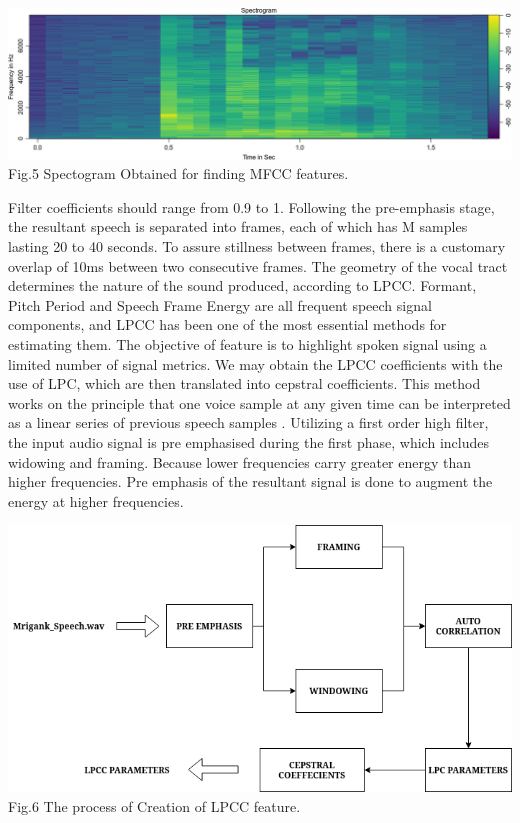 \documentclass[11pt,a4paper]{article}
\begin{document}
    \begin{center}
	
	\includegraphics[scale=0.22]{SPECTOGRAM_IMG.png} \\ 
	Fig.5 Spectogram Obtained for finding MFCC features. \\
	
\end{center} 
Filter coefficients should range from 0.9 to 1. Following the pre-emphasis stage, the resultant speech is separated into frames, each of which has M samples lasting 20 to 40 seconds. To assure stillness between frames, there is a customary overlap of 10ms between two consecutive frames. The geometry of the vocal tract determines the nature of the sound produced, according to LPCC. Formant, Pitch Period and Speech Frame Energy are all frequent speech signal components, and LPCC has been one of the most essential methods for estimating them. The objective of feature is to highlight spoken signal using a limited number of signal metrics. We may obtain the LPCC coefficients with the use of LPC, which are then translated into cepstral coefficients. This method works on the principle that one voice sample at any given time can be interpreted as a linear series of previous speech samples \cite{palo2021effect}. Utilizing a first order high filter, the input audio signal is pre emphasised during the first phase, which includes widowing and framing. Because lower frequencies carry greater energy than higher frequencies. Pre emphasis of the resultant signal is done to augment the energy at higher frequencies. 
    \begin{center}
	
	\includegraphics[scale=0.30]{LPCC_PARAMETERS.png} \\ 
	         Fig.6 The process of Creation of LPCC feature. \\
	
\end{center} 
\end{document}
